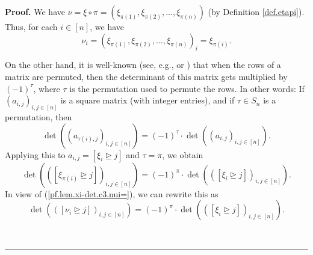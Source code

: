 \documentclass[numbers=enddot,12pt,final,onecolumn,notitlepage,english]{scrartcl}%
\theoremstyle{definition}
\newenvironment{proof}[1][Proof]{\noindent\textbf{#1.} }{\ \rule{0.5em}{0.5em}}
\newenvironment{verlong}{}{}
\begin{document}
\begin{proof}
\begin{verlong}
We have $\nu=\xi\circ\pi=\left(  \xi_{\pi\left(  1\right)  },\xi_{\pi\left(
2\right)  },\ldots,\xi_{\pi\left(  n\right)  }\right)  $ (by Definition
\ref{def.etapi}). Thus, for each $i\in\left[  n\right]  $, we have
\begin{equation}
\nu_{i}=\left(  \xi_{\pi\left(  1\right)  },\xi_{\pi\left(  2\right)  }%
,\ldots,\xi_{\pi\left(  n\right)  }\right)  _{i}=\xi_{\pi\left(  i\right)  }.
\label{pf.lem.xi-det.c3.nui=}%
\end{equation}


On the other hand, it is well-known (see, e.g., \cite[Corollary 6.4.15]{21s}
or \cite[Lemma 6.17 \textbf{(a)}]{detnotes}) that when the rows of a matrix
are permuted, then the determinant of this matrix gets multiplied by $\left(
-1\right)  ^{\tau}$, where $\tau$ is the permutation used to permute the rows.
In other words: If $\left(  a_{i,j}\right)  _{i,j\in\left[  n\right]  }$ is a
square matrix (with integer entries), and if $\tau\in S_{n}$ is a permutation,
then%
\[
\det\left(  \left(  a_{\tau\left(  i\right)  ,j}\right)  _{i,j\in\left[
n\right]  }\right)  =\left(  -1\right)  ^{\tau}\cdot\det\left(  \left(
a_{i,j}\right)  _{i,j\in\left[  n\right]  }\right)  .
\]
Applying this to $a_{i,j}=\left[  \xi_{i}\trianglerighteq j\right]  $ and
$\tau=\pi$, we obtain%
\[
\det\left(  \left(  \left[  \xi_{\pi\left(  i\right)  }\trianglerighteq
j\right]  \right)  _{i,j\in\left[  n\right]  }\right)  =\left(  -1\right)
^{\pi}\cdot\det\left(  \left(  \left[  \xi_{i}\trianglerighteq j\right]
\right)  _{i,j\in\left[  n\right]  }\right)  .
\]
In view of (\ref{pf.lem.xi-det.c3.nui=}), we can rewrite this as%
\begin{equation}
\det\left(  \left(  \left[  \nu_{i}\trianglerighteq j\right]  \right)
_{i,j\in\left[  n\right]  }\right)  =\left(  -1\right)  ^{\pi}\cdot\det\left(
\left(  \left[  \xi_{i}\trianglerighteq j\right]  \right)  _{i,j\in\left[
n\right]  }\right)  . \label{pf.lem.xi-det.c3.det=1}%
\end{equation}

\end{verlong}


\end{proof}
\end{document}
